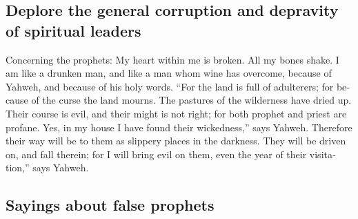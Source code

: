 \begin{paracol}{2}
\begin{otherlanguage}{english}
\hypertarget{deplore-the-general-corruption-and-depravity-of-spiritual-leaders}{%
\subsection{Deplore the general corruption and depravity of spiritual
leaders}\label{deplore-the-general-corruption-and-depravity-of-spiritual-leaders}}

 Concerning the prophets: My heart within me is broken.
All my bones shake. I am like a drunken man, and like a man whom wine
has overcome, because of Yahweh, and because of his holy words.
 ``For the land is full of adulterers; for because of the
curse the land mourns. The pastures of the wilderness have dried up.
Their course is evil, and their might is not right;  for
both prophet and priest are profane. Yes, in my house I have found their
wickedness,'' says Yahweh.  Therefore their way will be
to them as slippery places in the darkness. They will be driven on, and
fall therein; for I will bring evil on them, even the year of their
visitation,'' says Yahweh.

\hypertarget{sayings-about-false-prophets}{%
\subsection{Sayings about false
prophets}\label{sayings-about-false-prophets}}


\end{otherlanguage}
\end{paracol}
